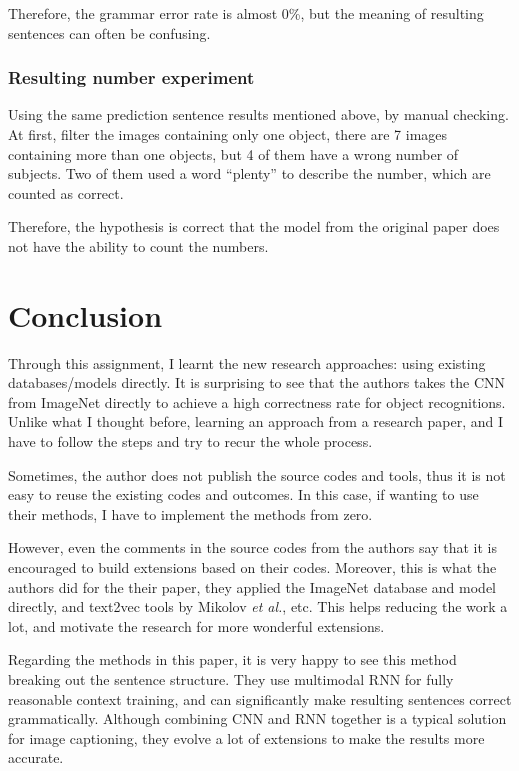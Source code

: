 \documentclass[10pt,twocolumn,letterpaper]{article}
\begin{document}
Therefore, the grammar error rate is almost 0\%, but the meaning of resulting sentences can often be confusing.


\subsubsection{Resulting number experiment} \label{sec:rn}
Using the same prediction sentence results mentioned above, by manual checking.
At first, filter the images containing only one object, there are 7 images containing more than one objects,
but 4 of them have a wrong number of subjects. Two of them used a word ``plenty'' to describe the number, which are counted as correct.

Therefore, the hypothesis is correct that the model from the original paper does not have the ability to count the numbers.


\section{Conclusion}
Through this assignment, I learnt the new research approaches: using existing databases/models directly.
It is surprising to see that the authors takes the CNN from ImageNet directly
to achieve a high correctness rate for object recognitions.
Unlike what I thought before, learning an approach from a research paper,
and I have to follow the steps and try to recur the whole process.

Sometimes, the author does not publish the source codes and tools,
thus it is not easy to reuse the existing codes and outcomes.
In this case, if wanting to use their methods, I have to implement the methods from zero.

However, even the comments in the source codes from the authors say that it is encouraged to build extensions based on their codes.
Moreover, this is what the authors did for the their paper, they applied the ImageNet database and model directly,
and text2vec tools by Mikolov \textit{et al.}, etc.
This helps reducing the work a lot, and motivate the research for more wonderful extensions.

Regarding the methods in this paper, it is very happy to see this method breaking out the sentence structure.
They use multimodal RNN for fully reasonable context training,
and can significantly make resulting sentences correct grammatically.
Although combining CNN and RNN together is a typical solution for image captioning,
they evolve a lot of extensions to make the results more accurate.
\end{document}
